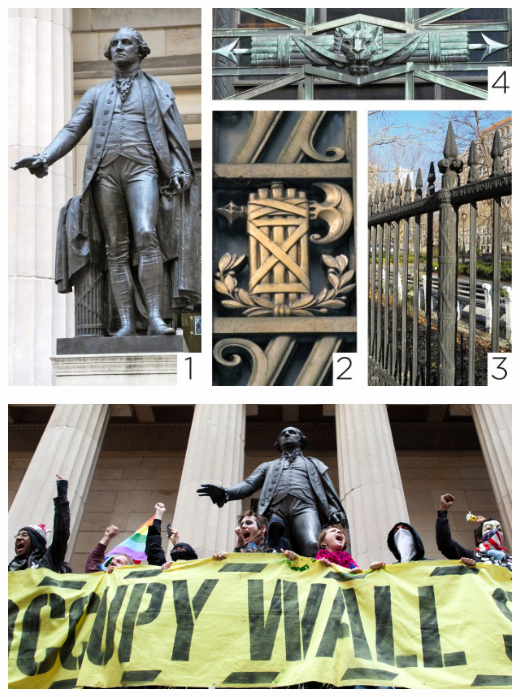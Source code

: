 \begin{frame}
    \centering
    \includegraphics[width=.9\textwidth]{img/fasces/fasces-stuff.jpg} \\
\end{frame}
\begin{frame}
    \centering
    \includegraphics[width=.9\textwidth]{img/fasces/ows.jpg} \\
\end{frame}
